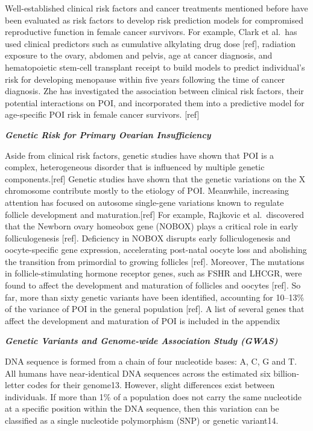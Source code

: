 \documentclass[
]{book}
\begin{document}
Well-established clinical risk factors and cancer treatments mentioned before have been evaluated as risk factors to develop risk prediction models for compromised reproductive function in female cancer survivors. For example, Clark et al.~has used clinical predictors such as cumulative alkylating drug dose {[}ref{]}, radiation exposure to the ovary, abdomen and pelvis, age at cancer diagnosis, and hematopoietic stem-cell transplant receipt to build models to predict individual's risk for developing menopause within five years following the time of cancer diagnosis. Zhe has investigated the association between clinical risk factors, their potential interactions on POI, and incorporated them into a predictive model for age-specific POI risk in female cancer survivors. {[}ref{]}

\textbf{\emph{Genetic Risk for Primary Ovarian Insufficiency}}

Aside from clinical risk factors, genetic studies have shown that POI is a complex, heterogeneous disorder that is influenced by multiple genetic components.{[}ref{]} Genetic studies have shown that the genetic variations on the X chromosome contribute mostly to the etiology of POI. Meanwhile, increasing attention has focused on autosome single-gene variations known to regulate follicle development and maturation.{[}ref{]} For example, Rajkovic et al.~discovered that the Newborn ovary homeobox gene (NOBOX) plays a critical role in early folliculogenesis {[}ref{]}. Deficiency in NOBOX disrupts early folliculogenesis and oocyte-specific gene expression, accelerating post-natal oocyte loss and abolishing the transition from primordial to growing follicles {[}ref{]}. Moreover, The mutations in follicle-stimulating hormone receptor genes, such as FSHR and LHCGR, were found to affect the development and maturation of follicles and oocytes {[}ref{]}. So far, more than sixty genetic variants have been identified, accounting for 10--13\% of the variance of POI in the general population {[}ref{]}. A list of several genes that affect the development and maturation of POI is included in the appendix

\textbf{\emph{Genetic Variants and Genome-wide Association Study (GWAS)}}

DNA sequence is formed from a chain of four nucleotide bases: A, C, G and T. All humans have near-identical DNA sequences across the estimated six billion-letter codes for their genome13. However, slight differences exist between individuals. If more than 1\% of a population does not carry the same nucleotide at a specific position within the DNA sequence, then this variation can be classified as a single nucleotide polymorphism (SNP) or genetic variant14.
\end{document}
